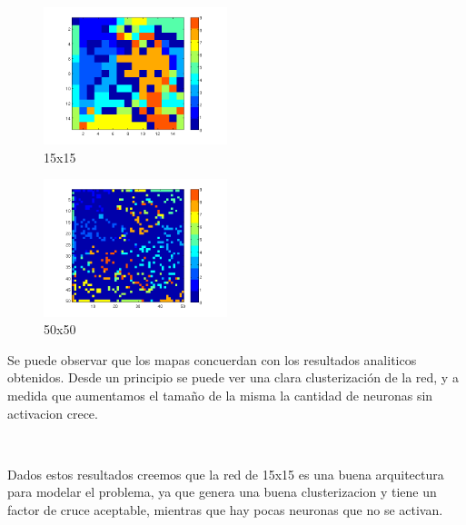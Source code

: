 \documentclass[informe.tex]{subfiles}
\begin{document}
       \begin{minipage}{0.30\textwidth}
	 \centering
	 \begin{figure}[H]
	  \centering
	    \includegraphics[height=4cm,keepaspectratio]{graficos/calor/calor_15x15.png}
		  \caption{\small 15x15}
	 \end{figure}
	 \begin{figure}[H]
	  \centering
	    \includegraphics[height=4cm,keepaspectratio]{graficos/calor/calor_50x50.png}
		  \caption{\small 50x50}
	 \end{figure}
       \end{minipage}     
       
       \vspace{20pt}
       
       Se puede observar que los mapas concuerdan con los resultados analiticos obtenidos. Desde un principio se puede ver una clara clusterizaci\'on de la red, y a medida que aumentamos el tama\~no de la misma la cantidad de neuronas sin activacion crece. 
       
       ~
       
       Dados estos resultados creemos que la red de 15x15 es una buena arquitectura para modelar el problema, ya que genera una buena clusterizacion y tiene un factor de cruce aceptable, mientras que hay pocas neuronas que no se activan.
	
\end{document}
